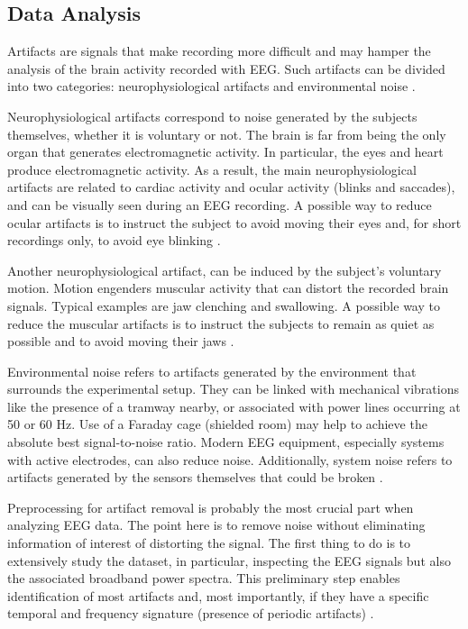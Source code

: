 \documentclass[../../../main.tex]{subfiles}
\begin{document}
\subsection{Data Analysis}

Artifacts are signals that make recording more difficult and may hamper the analysis of the brain activity recorded with EEG. Such artifacts can be divided into two categories: neurophysiological artifacts and environmental noise \cite{Corsi2023}.

Neurophysiological artifacts correspond to noise generated by the subjects themselves, whether it is voluntary or not. The brain is far from being the only organ that generates electromagnetic activity. In particular, the eyes and heart produce electromagnetic activity. As a result, the main neurophysiological artifacts are related to cardiac activity and ocular activity (blinks and saccades), and can be visually seen during an EEG recording. A possible way to reduce ocular artifacts is to instruct the subject to avoid moving their eyes and, for short recordings only, to avoid eye blinking \cite{Corsi2023}.

Another neurophysiological artifact, can be induced by the subject's voluntary motion. Motion engenders muscular activity that can distort the recorded brain signals. Typical examples are jaw clenching and swallowing. A possible way to reduce the muscular artifacts is to instruct the subjects to remain as quiet as possible and to avoid moving their jaws \cite{Corsi2023}.

Environmental noise refers to artifacts generated by the environment that surrounds the experimental setup. They can be linked with mechanical vibrations like the presence of a tramway nearby, or associated with power lines occurring at 50 or 60 Hz. Use of a Faraday cage (shielded room) may help to achieve the absolute best signal-to-noise ratio. Modern EEG equipment, especially systems with active electrodes, can also reduce noise. Additionally, system noise refers to artifacts generated by the sensors themselves that could be broken \cite{Corsi2023}.

Preprocessing for artifact removal is probably the most crucial part when analyzing EEG data. The point here is to remove noise without eliminating information of interest of distorting the signal. The first thing to do is to extensively study the dataset, in particular, inspecting the EEG signals but also the associated broadband power spectra. This preliminary step enables identification of most artifacts and, most importantly, if they have a specific temporal and frequency signature (presence of periodic artifacts) \cite{Corsi2023}.
\end{document}
